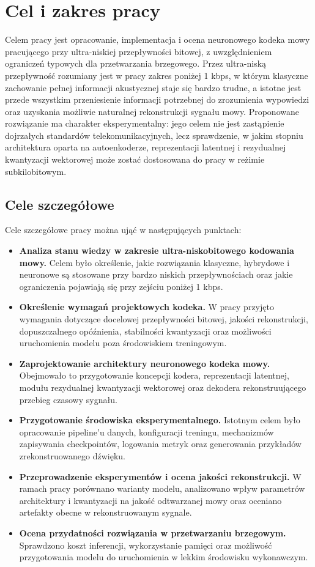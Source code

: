 \section{Cel i zakres pracy}
\label{sec:cel-zakres}

Celem pracy jest opracowanie, implementacja i ocena neuronowego kodeka mowy pracującego przy ultra-niskiej przepływności bitowej, z uwzględnieniem ograniczeń typowych dla przetwarzania brzegowego. Przez ultra-niską przepływność rozumiany jest w pracy zakres poniżej 1 kbps, w którym klasyczne zachowanie pełnej informacji akustycznej staje się bardzo trudne, a istotne jest przede wszystkim przeniesienie informacji potrzebnej do zrozumienia wypowiedzi oraz uzyskania możliwie naturalnej rekonstrukcji sygnału mowy. Proponowane rozwiązanie ma charakter eksperymentalny: jego celem nie jest zastąpienie dojrzałych standardów telekomunikacyjnych, lecz sprawdzenie, w jakim stopniu architektura oparta na autoenkoderze, reprezentacji latentnej i rezydualnej kwantyzacji wektorowej może zostać dostosowana do pracy w reżimie subkilobitowym.

\subsection{Cele szczegółowe}
\label{subsec:cele-szczegolowe}

Cele szczegółowe pracy można ująć w następujących punktach:

\begin{itemize}
    \item \textbf{Analiza stanu wiedzy w zakresie ultra-niskobitowego kodowania mowy.} Celem było określenie, jakie rozwiązania klasyczne, hybrydowe i neuronowe są stosowane przy bardzo niskich przepływnościach oraz jakie ograniczenia pojawiają się przy zejściu poniżej 1 kbps.
    \item \textbf{Określenie wymagań projektowych kodeka.} W pracy przyjęto wymagania dotyczące docelowej przepływności bitowej, jakości rekonstrukcji, dopuszczalnego opóźnienia, stabilności kwantyzacji oraz możliwości uruchomienia modelu poza środowiskiem treningowym.
    \item \textbf{Zaprojektowanie architektury neuronowego kodeka mowy.} Obejmowało to przygotowanie koncepcji kodera, reprezentacji latentnej, modułu rezydualnej kwantyzacji wektorowej oraz dekodera rekonstruującego przebieg czasowy sygnału.
    \item \textbf{Przygotowanie środowiska eksperymentalnego.} Istotnym celem było opracowanie pipeline'u danych, konfiguracji treningu, mechanizmów zapisywania checkpointów, logowania metryk oraz generowania przykładów zrekonstruowanego dźwięku.
    \item \textbf{Przeprowadzenie eksperymentów i ocena jakości rekonstrukcji.} W ramach pracy porównano warianty modelu, analizowano wpływ parametrów architektury i kwantyzacji na jakość odtwarzanej mowy oraz oceniano artefakty obecne w rekonstruowanym sygnale.
    \item \textbf{Ocena przydatności rozwiązania w przetwarzaniu brzegowym.} Sprawdzono koszt inferencji, wykorzystanie pamięci oraz możliwość przygotowania modelu do uruchomienia w lekkim środowisku wykonawczym.
\end{itemize}


